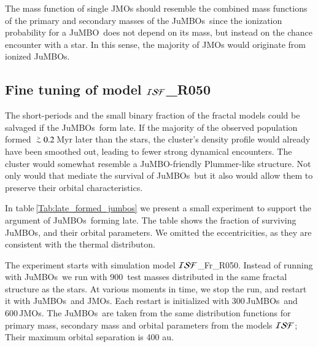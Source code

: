 \documentclass[submission,phys]{lib/SciPost}
\def\apgt{\ {\raise-.5ex\hbox{$\buildrel>\over\sim$}}\ }
\newcommand{\jumbo}{\mbox{JuMBO}}
\newcommand{\jumbos}{\mbox{JuMBOs}}
\begin{document}
The mass function of single JMOs should resemble the combined mass functions 
of the primary and secondary masses of the \jumbos\, since the ionization 
probability for a \jumbo\, does not depend on its mass, but instead on the 
chance encounter with a star. In this sense, the majority of JMOs would originate
from ionized \jumbos.  


\subsection{Fine tuning of model ${\cal ISF}$\_R050}\label{Sect:Disc:finetuning}

The short-periods and the small binary fraction of the fractal models
could be salvaged if the \jumbos\, form late. If the majority of the
observed population formed $\apgt 0.2$\,Myr later than the stars, the
cluster's density profile would already have been smoothed out,
leading to fewer strong dynamical encounters. The cluster would
somewhat resemble a \jumbo -friendly Plummer-like structure. Not only
would that mediate the survival of \jumbos\, but it also would allow
them to preserve their orbital characteristics.

In table\,\ref{Tab:late_formed_jumbos} we present a small experiment
to support the argument of \jumbos\, forming late.  The table shows the
fraction of surviving \jumbos, and their orbital parameters. We omitted
the eccentricities, as they are consistent with the thermal
distributon.

The experiment starts with simulation model ${\cal ISF}$\_Fr\_R050.
Instead of running with \jumbos\, we run with 900\, test masses
distributed in the same fractal structure as the stars.  At various
moments in time, we stop the run, and restart it with \jumbos\, and
JMOs.  Each restart is initialized with 300\,\jumbos\, and 600\,JMOs.
The \jumbos\, are taken from the same distribution functions for
primary mass, secondary mass and orbital parameters from the models
${\cal ISF}$; Their maximum orbital separation is 400 au.
\end{document}
